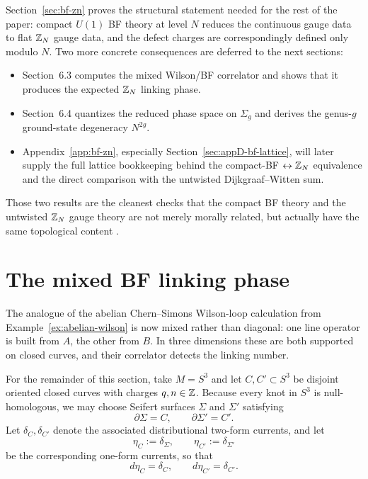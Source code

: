 \begin{remark}\label{rem:bf-zn-scope}
Section~\ref{sec:bf-zn} proves the structural statement needed for the rest of the paper: compact $U(1)$ BF theory at level $N$ reduces the continuous gauge data to flat $\mathbb{Z}_N$ gauge data, and the defect charges are correspondingly defined only modulo $N$. Two more concrete consequences are deferred to the next sections:
\begin{itemize}
\item Section~6.3 computes the mixed Wilson/BF correlator and shows that it produces the expected $\mathbb{Z}_N$ linking phase.
\item Section~6.4 quantizes the reduced phase space on $\Sigma_g$ and derives the genus-$g$ ground-state degeneracy $N^{2g}$.
\item Appendix~\ref{app:bf-zn}, especially Section~\ref{sec:appD-bf-lattice}, will later supply the full lattice bookkeeping behind the compact-BF $\leftrightarrow \mathbb{Z}_N$ equivalence and the direct comparison with the untwisted Dijkgraaf--Witten sum.
\end{itemize}
Those two results are the cleanest checks that the compact BF theory and the untwisted $\mathbb{Z}_N$ gauge theory are not merely morally related, but actually have the same topological content \cite{Horowitz1989,GKSW2015,Bhardwaj2023Lectures}.
\end{remark}

\section{The mixed BF linking phase}\label{sec:bf-linking}

The analogue of the abelian Chern--Simons Wilson-loop calculation from Example~\ref{ex:abelian-wilson} is now mixed rather than diagonal: one line operator is built from $A$, the other from $B$. In three dimensions these are both supported on closed curves, and their correlator detects the linking number.

\begin{assumption}\label{ass:bf-linking}
For the remainder of this section, take $M=S^3$ and let $C,C'\subset S^3$ be disjoint oriented closed curves with charges $q,n\in \mathbb{Z}$. Because every knot in $S^3$ is null-homologous, we may choose Seifert surfaces $\Sigma$ and $\Sigma'$ satisfying
\begin{equation*}
\partial \Sigma = C,
\qquad
\partial \Sigma' = C'.
\end{equation*}
Let $\delta_C,\delta_{C'}$ denote the associated distributional two-form currents, and let
\begin{equation*}
\eta_C:=\delta_\Sigma,
\qquad
\eta_{C'}:=\delta_{\Sigma'}
\end{equation*}
be the corresponding one-form currents, so that
\begin{equation}\label{eq:bf-current-boundaries}
d\eta_C=\delta_C,
\qquad
d\eta_{C'}=\delta_{C'}.
\end{equation}
\end{assumption}

